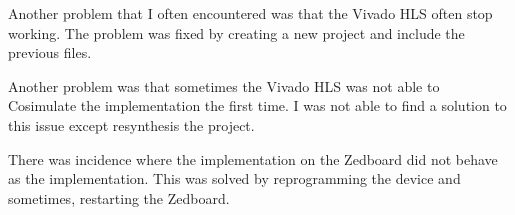 Another problem that I often encountered was that the Vivado HLS often stop working. The problem was fixed by creating a new project and include the previous files.

Another problem was that sometimes the Vivado HLS was not able to Cosimulate the implementation the first time. I was not able to find a solution to this issue except resynthesis the project. 

There was incidence where the implementation on the Zedboard did not behave as the implementation. This was solved by reprogramming the device and sometimes, restarting the Zedboard.

